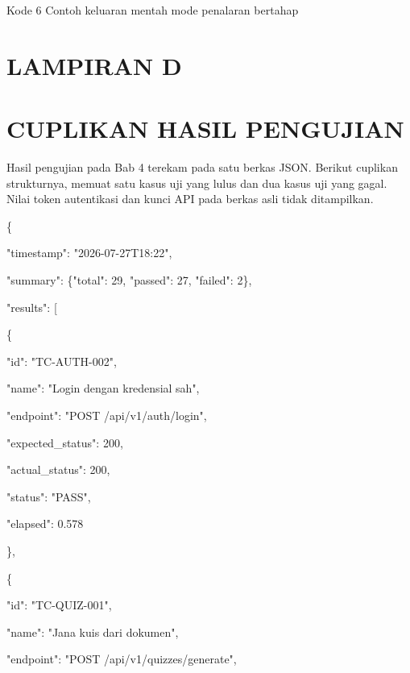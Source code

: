\documentclass[12pt,a4paper]{article}
\begin{document}
Kode 6	Contoh keluaran mentah mode penalaran bertahap



\section*{LAMPIRAN D}

\section*{CUPLIKAN HASIL PENGUJIAN}

Hasil pengujian pada Bab 4 terekam pada satu berkas JSON. Berikut cuplikan strukturnya, memuat satu kasus uji yang lulus dan dua kasus uji yang gagal. Nilai token autentikasi dan kunci API pada berkas asli tidak ditampilkan.



\{



"timestamp": "2026-07-27T18:22",



"summary": \{"total": 29, "passed": 27, "failed": 2\},



"results": {[}



\{



"id": "TC-AUTH-002",



"name": "Login dengan kredensial sah",



"endpoint": "POST /api/v1/auth/login",



"expected\_status": 200,



"actual\_status": 200,



"status": "PASS",



"elapsed": 0.578



\},



\{



"id": "TC-QUIZ-001",



"name": "Jana kuis dari dokumen",



"endpoint": "POST /api/v1/quizzes/generate",
\end{document}

